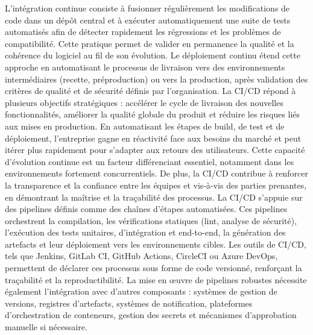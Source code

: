 L’intégration continue consiste à fusionner régulièrement les modifications de code dans un dépôt central et à exécuter automatiquement une suite de tests automatisés afin de détecter rapidement les régressions et les problèmes de compatibilité. Cette pratique permet de valider en permanence la qualité et la cohérence du logiciel au fil de son évolution. Le déploiement continu étend cette approche en automatisant le processus de livraison vers des environnements intermédiaires (recette, préproduction) ou vers la production, après validation des critères de qualité et de sécurité définis par l’organisation.
La CI/CD répond à plusieurs objectifs stratégiques : accélérer le cycle de livraison des nouvelles fonctionnalités, améliorer la qualité globale du produit et réduire les risques liés aux mises en production. En automatisant les étapes de build, de test et de déploiement, l’entreprise gagne en réactivité face aux besoins du marché et peut itérer plus rapidement pour s’adapter aux retours des utilisateurs. Cette capacité d’évolution continue est un facteur différenciant essentiel, notamment dans les environnements fortement concurrentiels. De plus, la CI/CD contribue à renforcer la transparence et la confiance entre les équipes et vis-à-vis des parties prenantes, en démontrant la maîtrise et la traçabilité des processus.
La CI/CD s’appuie sur des pipelines définis comme des chaînes d’étapes automatisées. Ces pipelines orchestrent la compilation, les vérifications statiques (lint, analyse de sécurité), l’exécution des tests unitaires, d’intégration et end-to-end, la génération des artefacts et leur déploiement vers les environnements cibles. Les outils de CI/CD, tels que Jenkins, GitLab CI, GitHub Actions, CircleCI ou Azure DevOps, permettent de déclarer ces processus sous forme de code versionné, renforçant la traçabilité et la reproductibilité. La mise en œuvre de pipelines robustes nécessite également l’intégration avec d’autres composants : systèmes de gestion de versions, registres d’artefacts, systèmes de notification, plateformes d’orchestration de conteneurs, gestion des secrets et mécanismes d’approbation manuelle si nécessaire.

